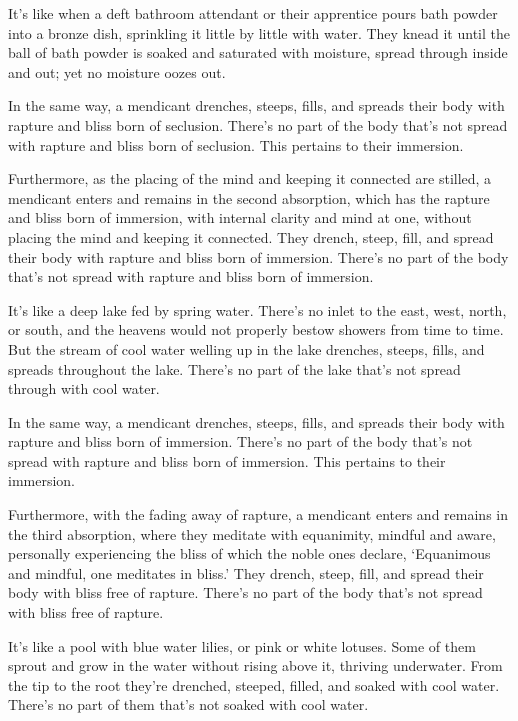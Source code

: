 \documentclass[12pt,openany]{book}%
\begin{document}
It’s like when a deft bathroom attendant or their apprentice pours bath powder into a bronze dish, sprinkling it little by little with water. They knead it until the ball of bath powder is soaked and saturated with moisture, spread through inside and out; yet no moisture oozes out. 

In the same way, a mendicant drenches, steeps, fills, and spreads their body with rapture and bliss born of seclusion. There’s no part of the body that’s not spread with rapture and bliss born of seclusion. This pertains to their immersion. 

Furthermore, as the placing of the mind and keeping it connected are stilled, a mendicant enters and remains in the second absorption, which has the rapture and bliss born of immersion, with internal clarity and mind at one, without placing the mind and keeping it connected. They drench, steep, fill, and spread their body with rapture and bliss born of immersion. There’s no part of the body that’s not spread with rapture and bliss born of immersion. 

It’s like a deep lake fed by spring water. There’s no inlet to the east, west, north, or south, and the heavens would not properly bestow showers from time to time. But the stream of cool water welling up in the lake drenches, steeps, fills, and spreads throughout the lake. There’s no part of the lake that’s not spread through with cool water. 

In the same way, a mendicant drenches, steeps, fills, and spreads their body with rapture and bliss born of immersion. There’s no part of the body that’s not spread with rapture and bliss born of immersion. This pertains to their immersion. 

Furthermore, with the fading away of rapture, a mendicant enters and remains in the third absorption, where they meditate with equanimity, mindful and aware, personally experiencing the bliss of which the noble ones declare, ‘Equanimous and mindful, one meditates in bliss.’ They drench, steep, fill, and spread their body with bliss free of rapture. There’s no part of the body that’s not spread with bliss free of rapture. 

It’s like a pool with blue water lilies, or pink or white lotuses. Some of them sprout and grow in the water without rising above it, thriving underwater. From the tip to the root they’re drenched, steeped, filled, and soaked with cool water. There’s no part of them that’s not soaked with cool water. 
\end{document}
